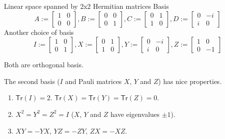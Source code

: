 \documentclass{beamer}
\newcommand{\Tr}{\mathsf{Tr}}
\begin{document}
\begin{frame}{Linear space spanned by 2x2 Hermitian matrices}
Basis
\begin{equation*}
A:=
\begin{bmatrix}
1&0\\
0&0
\end{bmatrix}
,
B:=
\begin{bmatrix}
0&0\\
0&1
\end{bmatrix}
,
C:=
\begin{bmatrix}
0&1\\
1&0
\end{bmatrix}
,
D:=
\begin{bmatrix}
0&-i\\
i&0
\end{bmatrix}
\end{equation*}
Another choice of basis
\begin{equation*}
I:=
\begin{bmatrix}
1&0\\
0&1
\end{bmatrix}
,
X:=
\begin{bmatrix}
0&1\\
1&0
\end{bmatrix}
,
Y:=
\begin{bmatrix}
0&-i\\
i&0
\end{bmatrix}
,
Z:=
\begin{bmatrix}
1&0\\
0&-1
\end{bmatrix}
\end{equation*}

Both are orthogonal basis.

The second basis ($I$ and Pauli matrices $X$, $Y$ and $Z$) has nice properties.
\begin{enumerate}
\item $\Tr(I)=2$. $\Tr(X)=\Tr(Y)=\Tr(Z)=0$.
\item $X^2 = Y^2 = Z^2 = I$ ($X$, $Y$ and $Z$ have eigenvalues $\pm 1$).
\item $XY=-YX,\,YZ=-ZY,\,ZX=-XZ$.
\end{enumerate}
\end{frame}
\end{document}
